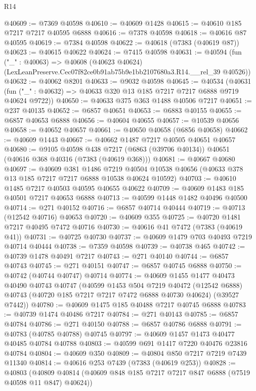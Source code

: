 \begin{lexlean}{R14}
\begin{coremodule}
@40609 := @7369 @40598
@40610 := @40609 @1428
@40615 := @40610 @185 @7217 @7217 @40595 @6888
@40616 := @7378 @40598
@40618 := @40616 @87 @40595
@40619 := @7384 @40598
@40622 := @40618 (@7383 (@40619 @87))
@40623 := @40615 @40622
@40624 := @7415 @40598
@40631 := @40594
    (fun ("_" : @40063) =>
    @40608 (@40623 @40624) (LexLeanPreserve.Cec07f82ce0b91ab75b9e1bb2107680a3.R14.__rel_39 @40526))
@40632 := @40062 @8201
@40633 := @9032 @40598
@40645 := @40534
    (@40631 (fun ("_" : @40632) => @40633 @320 @13 @185 @7217 @7217 @6888 @9719 @40624 @9722))
@40650 := @40633 @375 @363 @1488 @40506 @7217
@40651 := @237 @40135
@40652 := @6857 @40651
@40653 := @6883 @40155
@40655 := @6857 @40653 @6888
@40656 := @40604 @40655
@40657 := @10539 @40656
@40658 := @40652 @40657
@40661 := @40650 @40658 (@6856 @40658)
@40662 := @40609 @1443
@40667 := @40662 @1487 @7217 @40505 @40651 @40657
@40680 := @9105
    @40598
    @438
    @7217
    (@6863 (@39706 @40134))
    @40651
    (@40616 @368 @40316 (@7383 (@40619 @368)))
@40681 := @40667 @40680
@40697 := @40609
    @381
    @1486
    @7219
    @40504
    @10538
    @40656
    (@40633 @378 @13 @185 @7217 @7217 @6888 @10538 @40624 @10592)
@40703 := @40610 @1485 @7217 @40503 @40595 @40655 @40622
@40709 := @40609 @1483 @185 @40501 @7217 @40653 @6888
@40713 := @40599 @1448 @1482 @40496 @40500
@40714 := @271 @40152
@40716 := @6857 @40714 @40444
@40719 := @40713 (@12542 @40716) @40653
@40720 := @40609 @355
@40725 := @40720 @1481 @7217 @40495 @7472 @40716
@40730 := @40616 @41 @7472 (@7383 (@40619 @41))
@40731 := @40725 @40730
@40737 := @40609 @1479 @703 @40493 @7219 @40714 @40444
@40738 := @7359 @40598
@40739 := @40738 @465
@40742 := @40739 @1478 @40491 @7217
@40743 := @271 @40140
@40744 := @6857 @40743
@40745 := @271 @40151
@40747 := @6857 @40745 @6888
@40750 := @40742 (@40744 @40747) @40714
@40774 := @40609
    @1455
    @1477
    @40473
    @40490
    @40743
    @40747
    (@40599
      @1453
      @504
      @7219
      @40472
      (@12542 @6888)
      @40743
      (@40720 @185 @7217 @7217 @7472 @6888 @40730 @40624)
      (@39527 @7442))
@40780 := @40609 @1475 @185 @40488 @7217 @40745 @6888
@40783 := @40739 @1474 @40486 @7217
@40784 := @271 @40143
@40785 := @6857 @40784
@40786 := @271 @40150
@40788 := @6857 @40786 @6888
@40791 := @40783 (@40785 @40788) @40745
@40797 := @40609 @1457 @1473 @40477 @40485 @40784 @40788
@40803 := @40599 @691 @1417 @7220 @40476 @23816 @40784
@40804 := @40609 @350
@40809 := @40804 @850 @7217 @7219 @7439 @11340
@40814 := @40616 @253 @7439 (@7383 (@40619 @253))
@40828 := @40803
    (@40809 @40814 (@40609 @848 @185 @7217 @7217 @847 @6888 (@7519 @40598 @11 @847) @40624))

\end{coremodule}
\end{lexlean}
